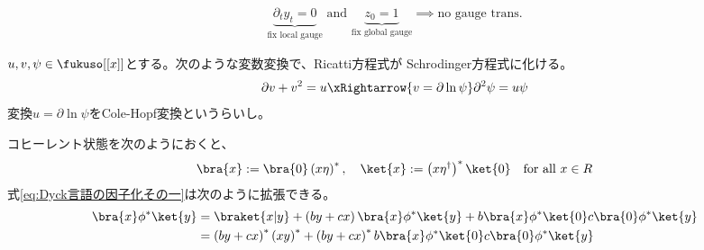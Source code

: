 {\begin{todo}[有理変換とゲージ変換]
\begin{itemize}
\begin{equation*}
\begin{split}
				\underbrace{\partial_ty_t = 0}_{\text{fix local gauge}} 
				\text{ and } \underbrace{z_0 = 1}_{\text{fix global gauge}}
				\implies \text{no gauge trans.}
			\end{split}\end{equation*}
		\end{itemize} %
	\end{todo} %
	\begin{todo}[Riccati方程式とSchrodinger方程式]
	\label{todo:Riccati方程式とSchrodinger方程式} %
		$u,v,\psi\in\fukuso[[x]]$とする。次のような変数変換で、Ricatti方程式が
		Schrodinger方程式に化ける。
		\begin{equation*}\begin{split}
			\partial v + v^2 = u \xRightarrow{v = \partial\ln\psi}
			\partial^2\psi = u\psi
		\end{split}\end{equation*}
		変換$u=\partial\ln\psi$をCole-Hopf変換というらいし。
	\end{todo} %
	\begin{todo}[Dyck言語のプロパゲーター]
	\label{todo:Dyck言語のプロパゲーター} %
		コヒーレント状態を次のようにおくと、
		\begin{equation*}\begin{split}
			\bra{x} := \bra{0}\lr{x\eta}^*
			,\quad \ket{x} := \lr{x\eta^\dag}^*\ket{0}
			\quad\text{for all } x\in R
		\end{split}\end{equation*}
		式\eqref{eq:Dyck言語の因子化その一}は次のように拡張できる。
		\begin{equation*}\begin{split}
			\bra{x}\phi^*\ket{y} &= \braket{x|y} 
				+ \lr{by + cx}\bra{x}\phi^*\ket{y}
				+ b\bra{x}\phi^*\ket{0}c\bra{0}\phi^*\ket{y} \\
			&= \lr{by + cx}^*\lr{xy}^*
				+ \lr{by + cx}^*b\bra{x}\phi^*\ket{0}c\bra{0}\phi^*\ket{y}
		\end{split}\end{equation*}
	\end{todo} %
}
